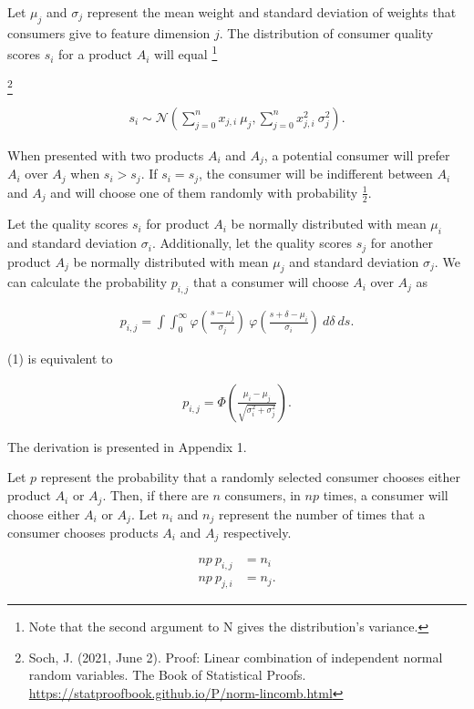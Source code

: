 \documentclass[]{article}
\begin{document}
Let \(\mu_j\) and \(\sigma_j\) represent the mean weight and standard
deviation of weights that consumers give to feature dimension \(j\). The
distribution of consumer quality scores \(s_i\) for a product \(A_i\)
will equal
\footnote{Note that the second argument to N gives the distribution's variance.}

\footnote{Soch, J. (2021, June 2). Proof:
  Linear combination of independent normal random variables. The Book of
  Statistical Proofs.
  \url{https://statproofbook.github.io/P/norm-lincomb.html} }

\begin{align}
s_i \sim \mathcal{N} (\sum_{j=0}^n x_{j,i}\ \mu_j, \sum_{j=0}^n x_{j,i}^2\ \sigma_j^2).
\end{align}

When presented with two products \(A_i\) and \(A_j\), a potential
consumer will prefer \(A_i\) over \(A_j\) when \(s_i > s_j\). If
\(s_i = s_j\), the consumer will be indifferent between \(A_i\) and
\(A_j\) and will choose one of them randomly with probability
\(\frac{1}{2}\).

Let the quality scores \(s_i\) for product \(A_i\) be normally
distributed with mean \(\mu_i\) and standard deviation \(\sigma_i\).
Additionally, let the quality scores \(s_j\) for another product \(A_j\)
be normally distributed with mean \(\mu_j\) and standard deviation
\(\sigma_j\). We can calculate the probability \(p_{i,j}\) that a
consumer will choose \(A_i\) over \(A_j\) as

\begin{align}
p_{i,j} = \int \int_0^{\infty} \varphi(\frac{s - \mu_j}{\sigma_j})\ \varphi (\frac{s + \delta - \mu_i}{\sigma_i})\ d\delta\ ds.
\end{align}

(1) is equivalent to

\begin{align}
p_{i,j} = \Phi (\frac{\mu_i - \mu_j}{\sqrt{\sigma_i^2 + \sigma_j^2}}).
\end{align}

The derivation is presented in Appendix 1.

Let \(p\) represent the probability that a randomly selected consumer
chooses either product \(A_i\) or \(A_j\). Then, if there are \(n\)
consumers, in \(np\) times, a consumer will choose either \(A_i\) or
\(A_j\). Let \(n_i\) and \(n_j\) represent the number of times that a
consumer chooses products \(A_i\) and \(A_j\) respectively.

\begin{align*}
np\ p_{i, j} &= n_i\\
np\ p_{j, i} &= n_j.
\end{align*}
\end{document}
